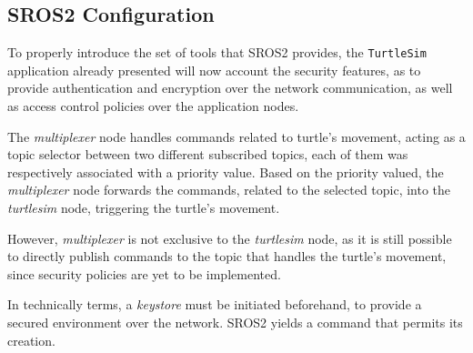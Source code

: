 \subsection{SROS2 Configuration}

To properly introduce the set of tools that SROS2 provides, the \texttt{TurtleSim} application already presented will now account the security features, as to provide authentication and encryption over the network communication, as well as access control policies over the application nodes. 
            
The \textit{multiplexer} node handles commands related to turtle's movement, acting as a topic selector between two different subscribed topics, each of them was respectively associated with a priority value. Based on the priority valued, the \textit{multiplexer} node forwards the commands, related to the selected topic, into the \textit{turtlesim} node, triggering the turtle's movement. 

However, \textit{multiplexer} is not exclusive to the \textit{turtlesim} node, as it is still possible to directly publish commands to the topic that handles the turtle's movement, since security policies are yet to be implemented.




In technically terms, a \textit{keystore} must be initiated beforehand, to provide a secured environment over the network. SROS2 yields a command that permits its creation. 

